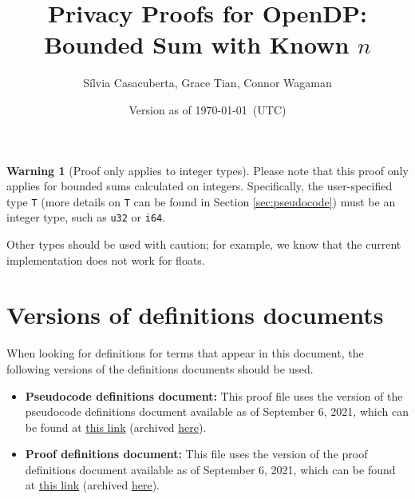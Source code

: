 \documentclass[11pt,a4paper]{article}
\title{Privacy Proofs for OpenDP: Bounded Sum with Known $n$}
\author{S\'ilvia Casacuberta, Grace Tian, Connor Wagaman}
\date{Version as of \today~(UTC)}
\theoremstyle{definition}
\newtheorem{warning}{Warning}
\begin{document}
\maketitle

\tableofcontents

\bigskip

\begin{tcolorbox}
\begin{warning}[Proof only applies to integer types]
Please note that this proof only applies for bounded sums calculated on integers. Specifically, the user-specified type \texttt{T} (more details on \texttt{T} can be found in Section \ref{sec:pseudocode}) must be an integer type, such as \texttt{u32} or \texttt{i64}.

Other types should be used with caution; for example, we know that the current implementation does not work for floats.
\end{warning}
\end{tcolorbox}

\section{Versions of definitions documents}
\label{sec:versioned-docs}

When looking for definitions for terms that appear in this document, the following versions of the definitions documents should be used.

\begin{itemize}
    \item \textbf{Pseudocode definitions document:} This proof file uses the version of the pseudocode definitions document available as of September 6, 2021, which can be found at \href{https://github.com/opendp/whitepapers/blob/f8b279ab249934182f306138fa14e6390ddae3e9/pseudocode-defns/pseudocode_defns.pdf}{this link} (archived \href{https://web.archive.org/web/20210906201546/https://raw.githubusercontent.com/opendp/whitepapers/pseudocode-defns/pseudocode-defns/pseudocode_defns.pdf}{here}).
    
    \item \textbf{Proof definitions document:} This file uses the version of the proof definitions document available as of September 6, 2021, which can be found at \href{https://github.com/opendp/whitepapers/blob/d4c24e55cc37878634fec0b7f5c89259a3ad3ded/proof-defns/proof_defns.pdf}{this link} (archived \href{https://web.archive.org/web/20210906201056/https://raw.githubusercontent.com/opendp/whitepapers/proof-defns/proof-defns/proof_defns.pdf}{here}). 
\end{itemize}
\end{document}

